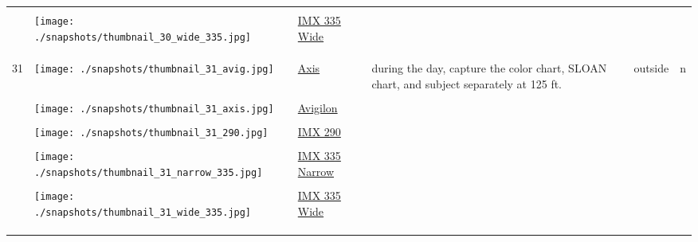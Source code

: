 \documentclass{article}%
\begin{document}
\begin{longtabu}{m{2.5cm} m{4cm} m{2cm} m{4cm} m{2cm} m{2cm}}
&&&&&\\%
&\texttt{[image: ./snapshots/thumbnail\_30\_wide\_335.jpg]}&\href{https://drive.google.com/file/d/1IlLRbg-xF_wkp81xQgG8aP6zht5tE3Qe/view?usp=sharing}{IMX 335 Wide}&&&\\%
&&&&&\\%
&&&&&\\%
\hline%
&&&&&\\%
31&\texttt{[image: ./snapshots/thumbnail\_31\_avig.jpg]}&\href{https://drive.google.com/file/d/1Fzq7fv66K2r6gkGE_5yxob429l-ULb8v/view?usp=sharing}{Axis}&during the day, capture the color chart, SLOAN chart, and subject separately at 125 ft.&outside&n\\%
&&&&&\\%
&\texttt{[image: ./snapshots/thumbnail\_31\_axis.jpg]}&\href{https://drive.google.com/file/d/1QJ0gEvfzzdC87EH7hzTOxVlGM26LLoR1/view?usp=sharing}{Avigilon}&&&\\%
&&&&&\\%
&\texttt{[image: ./snapshots/thumbnail\_31\_290.jpg]}&\href{https://drive.google.com/file/d/1sF-A4yzBrPFhpy0bxPe1o4_JCh8Np1XP/view?usp=sharing}{IMX 290}&&&\\%
&&&&&\\%
&\texttt{[image: ./snapshots/thumbnail\_31\_narrow\_335.jpg]}&\href{https://drive.google.com/file/d/1RilVYfD5CKR9ionW1_uuHuC_hDOOdUUM/view?usp=sharing}{IMX 335 Narrow}&&&\\%
&&&&&\\%
&\texttt{[image: ./snapshots/thumbnail\_31\_wide\_335.jpg]}&\href{https://drive.google.com/file/d/1sWnOwxzI_gKie6Yza3ki_s_eh44Qt561/view?usp=sharing}{IMX 335 Wide}&&&\\%
&&&&&\\%
&&&&&\\%
\hline%
&&&&&\\%
\end{longtabu}%
\end{document}
